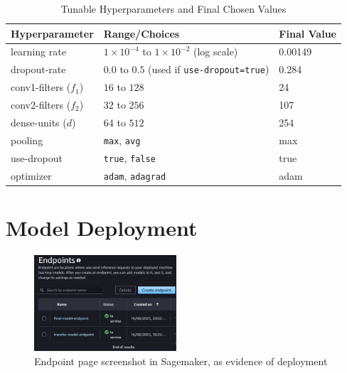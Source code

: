 \begin{table}[h]
\centering
\caption{Tunable Hyperparameters and Final Chosen Values}
\begin{tabular}{lll}
\toprule
\textbf{Hyperparameter} & \textbf{Range/Choices} & \textbf{Final Value} \\
\midrule
learning rate           & $1{\times}10^{-4}$ to $1{\times}10^{-2}$ (log scale) & 0.00149 \\
dropout-rate            & $0.0$ to $0.5$ (used if \texttt{use-dropout=true}) & 0.284 \\
conv1-filters ($f_1$)   & $16$ to $128$ & 24 \\
conv2-filters ($f_2$)   & $32$ to $256$ & 107 \\
dense-units ($d$)       & $64$ to $512$ & 254 \\
pooling                 & \texttt{max}, \texttt{avg} & max \\
use-dropout             & \texttt{true}, \texttt{false} & true \\
optimizer               & \texttt{adam}, \texttt{adagrad} & adam \\
\bottomrule
\end{tabular}
\label{tab:tunable_hyperparameters}
\end{table}


\begin{figure}[p]
    
\end{figure}

\newpage

\section{Model Deployment} \label{sec:model_deployment}

\begin{figure}[h]
    \centering
    \includegraphics[width=200px]{figures/endpoints_screenshot.png} %
    \centering
    \caption{Endpoint page screenshot in Sagemaker, as evidence of deployment} %
    \label{fig:endpoint} %
\end{figure}

